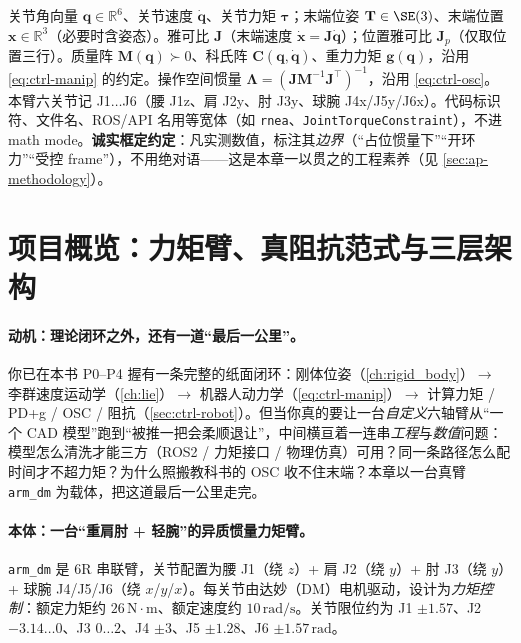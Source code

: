 \begin{note}[本章记号与约定]\label{note:ap-notation}
关节角向量 $\mathbf{q}\in\mathbb{R}^6$、关节速度 $\dot{\mathbf{q}}$、关节力矩 $\boldsymbol{\tau}$；末端位姿 $\mathbf{T}\in\SE(3)$、末端位置 $\mathbf{x}\in\mathbb{R}^3$（必要时含姿态）。雅可比 $\mathbf{J}$（末端速度 $\dot{\mathbf{x}}=\mathbf{J}\dot{\mathbf{q}}$）；位置雅可比 $\mathbf{J}_p$（仅取位置三行）。质量阵 $\mathbf{M}(\mathbf{q})\succ0$、科氏阵 $\mathbf{C}(\mathbf{q},\dot{\mathbf{q}})$、重力力矩 $\mathbf{g}(\mathbf{q})$，沿用 \cref{eq:ctrl-manip} 的约定。操作空间惯量 $\boldsymbol{\Lambda}=(\mathbf{J}\mathbf{M}^{-1}\mathbf{J}^\top)^{-1}$，沿用 \cref{eq:ctrl-osc}。本臂六关节记 J1$\dots$J6（腰 J1z、肩 J2y、肘 J3y、球腕 J4x/J5y/J6x）。代码标识符、文件名、ROS/API 名用等宽体（如 \texttt{rnea}、\texttt{JointTorqueConstraint}），不进 math mode。\textbf{诚实框定约定}：凡实测数值，标注其\emph{边界}（“占位惯量下”“开环力”“受控 frame”），不用绝对语——这是本章一以贯之的工程素养（见 \cref{sec:ap-methodology}）。
\end{note}

\section{项目概览：力矩臂、真阻抗范式与三层架构}
\label{sec:ap-overview}

\paragraph{动机：理论闭环之外，还有一道“最后一公里”。}
你已在本书 P0--P4 握有一条完整的纸面闭环：刚体位姿（\cref{ch:rigid_body}）$\to$ 李群速度运动学（\cref{ch:lie}）$\to$ 机器人动力学（\cref{eq:ctrl-manip}）$\to$ 计算力矩 / PD+g / OSC / 阻抗（\cref{sec:ctrl-robot}）。但当你真的要让一台\emph{自定义}六轴臂从“一个 CAD 模型”跑到“被推一把会柔顺退让”，中间横亘着一连串\emph{工程}与\emph{数值}问题：模型怎么清洗才能三方（ROS2 / 力矩接口 / 物理仿真）可用？同一条路径怎么配时间才不超力矩？为什么照搬教科书的 OSC 收不住末端？本章以一台真臂 \texttt{arm\_dm} 为载体，把这道最后一公里走完。

\paragraph{本体：一台“重肩肘 + 轻腕”的异质惯量力矩臂。}
\texttt{arm\_dm} 是 6R 串联臂，关节配置为腰 J1（绕 $z$）+ 肩 J2（绕 $y$）+ 肘 J3（绕 $y$）+ 球腕 J4/J5/J6（绕 $x$/$y$/$x$）。每关节由达妙（DM）电机驱动，设计为\emph{力矩控制}：额定力矩约 $26\,\mathrm{N\!\cdot\! m}$、额定速度约 $10\,\mathrm{rad/s}$。关节限位约为 J1 $\pm1.57$、J2 $-3.14\dots0$、J3 $0\dots2$、J4 $\pm3$、J5 $\pm1.28$、J6 $\pm1.57\,\mathrm{rad}$。

